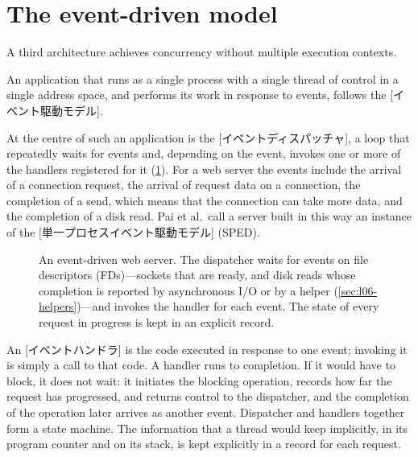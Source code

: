 \documentclass[../main.tex]{subfiles}
\begin{document}
\section{The event-driven model}
\label{sec:l06-event}

A third architecture achieves concurrency without multiple execution
contexts.

\begin{definition}
  An application that runs as a single process with a single thread of
  control in a single address space, and performs its work in response to
  events, follows the [イベント駆動モデル].
\end{definition}

At the centre of such an application is the
[イベントディスパッチャ], a loop that
repeatedly waits for events and, depending on the event, invokes one or more
of the handlers registered for it (\cref{fig:l06-event-driven}).  For a web
server the events include the arrival of a connection request, the arrival
of request data on a connection, the completion of a send, which means that
the connection can take more data, and the completion of a disk read.
Pai et al.\ call a server built in this way an instance of the
[単一プロセスイベント駆動モデル]%
 (SPED).

\begin{figure}[htbp]
  \centering
  
  \caption{An event-driven web server.  The dispatcher waits for events on
    file descriptors (FDs)---sockets that are ready, and disk reads whose
    completion is reported by asynchronous I/O or by a helper
    (\cref{sec:l06-helpers})---and invokes the handler for each event.  The
    state of every request in progress is kept in an explicit record.}
  \label{fig:l06-event-driven}
\end{figure}

An [イベントハンドラ] is the code executed in response
to one event; invoking it is simply a call to that code.  A handler runs to
completion.  If it would have
to block, it does not wait: it initiates the blocking operation, records how
far the request has progressed, and returns
control to the dispatcher, and the completion of the operation later
arrives as another event.  Dispatcher and handlers together form a state
machine.  The information that a thread would keep implicitly, in its
program counter and on its stack, is kept explicitly in a record for each
request.
\end{document}
